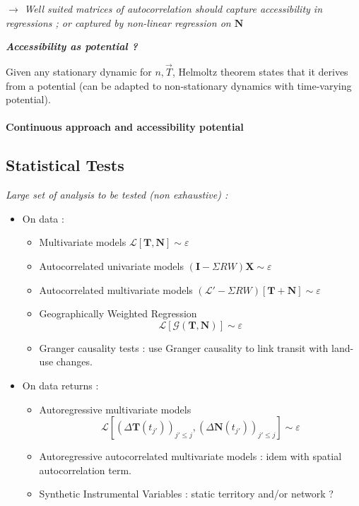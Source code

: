 $\rightarrow$ \textit{Well suited matrices of autocorrelation should capture accessibility in regressions ; or captured by non-linear regression on $\mathbf{N}$}

\medskip

{\normalsize\textit{\textbf{Accessibility as potential ?}}}

Given any stationary dynamic for $n,\vec{T}$, Helmoltz theorem states that it derives from a potential (can be adapted to non-stationary dynamics with time-varying potential).








\paragraph{Continuous approach and accessibility potential}







\subsection{Statistical Tests}



\textit{Large set of analysis to be tested (non exhaustive) :}
\begin{itemize}
\item On data :
\begin{itemize}
\item Multivariate models $\mathcal{L}\left[\mathbf{T},\mathbf{N}\right]\sim \varepsilon$
\item Autocorrelated univariate models $(\mathbf{I} - \Sigma R W) \mathbf{X} \sim \varepsilon$
\item Autocorrelated multivariate models $(\mathcal{L}' - \Sigma R W)\left[\mathbf{T}+\mathbf{N}\right] \sim \varepsilon$
\item Geographically Weighted Regression~\cite{brunsdon1998geographically}
\[
\mathcal{L}\left[\mathcal{G}\left(\mathbf{T},\mathbf{N}\right)\right] \sim \varepsilon
\]
\item Granger causality tests : \cite{xie2009streetcars} use Granger causality to link transit with land-use changes.
\end{itemize}
\item On data returns :
\begin{itemize}
\item Autoregressive multivariate models
\[\mathcal{L}\left[(\Delta \mathbf{T}(t_{j'}))_{j'\leq j},(\Delta \mathbf{N}(t_{j'}))_{j'\leq j}\right] \sim \varepsilon\]
\item Autoregressive autocorrelated multivariate models : idem with spatial autocorrelation term.
\item Synthetic Instrumental Variables : static territory and/or network ?
\end{itemize}
\end{itemize}



